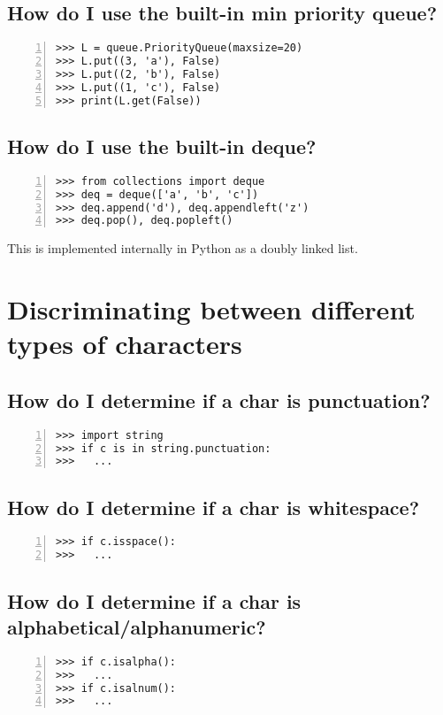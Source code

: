 \documentclass[12pt]{article}
\begin{document}
\subsection{How do I use the built-in min priority queue?}
\begin{lstlisting}[numbers=left]
>>> L = queue.PriorityQueue(maxsize=20)
>>> L.put((3, 'a'), False)
>>> L.put((2, 'b'), False)
>>> L.put((1, 'c'), False)
>>> print(L.get(False))
\end{lstlisting}

\subsection{How do I use the built-in deque?}
\begin{lstlisting}[numbers=left]
>>> from collections import deque
>>> deq = deque(['a', 'b', 'c'])
>>> deq.append('d'), deq.appendleft('z')
>>> deq.pop(), deq.popleft()
\end{lstlisting}
This is implemented internally in Python as a doubly linked list.
  
\section{Discriminating between different types of characters}
\subsection{How do I determine if a char is punctuation?}
\begin{lstlisting}[numbers=left]
>>> import string
>>> if c is in string.punctuation:
>>>   ...
\end{lstlisting}

\subsection{How do I determine if a char is whitespace?}
\begin{lstlisting}[numbers=left]
>>> if c.isspace():
>>>   ...
\end{lstlisting}

\subsection{How do I determine if a char is alphabetical/alphanumeric?}
\begin{lstlisting}[numbers=left]
>>> if c.isalpha():
>>>   ...
>>> if c.isalnum():
>>>   ...
\end{lstlisting}
\end{document}
